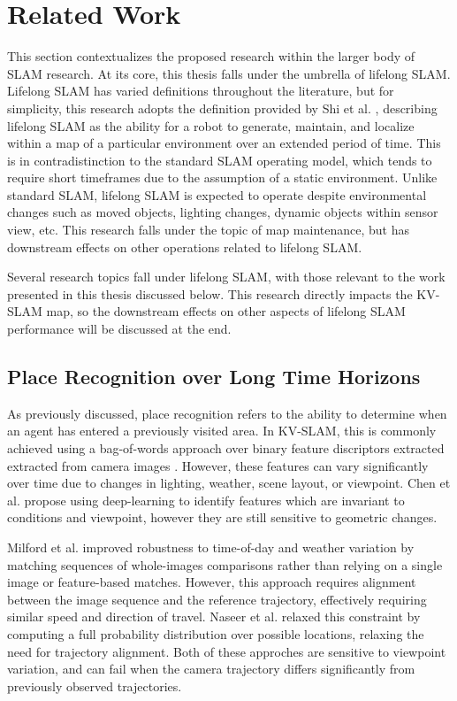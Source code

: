 \section{Related Work}
\label{sec:related_work}

This section contextualizes the proposed research within the larger body of SLAM research. At its core, this thesis falls under the umbrella of lifelong SLAM. Lifelong SLAM has varied definitions throughout the literature, but for simplicity, this research adopts the definition provided by Shi et al. \cite{shiAreWeReady2020}, describing lifelong SLAM as the ability for a robot to generate, maintain, and localize within a map of a particular environment over an extended period of time. This is in contradistinction to the standard SLAM operating model, which tends to require short timeframes due to the assumption of a static environment. Unlike standard SLAM, lifelong SLAM is expected to operate despite environmental changes such as moved objects, lighting changes, dynamic objects within sensor view, etc. This research falls under the topic of map maintenance, but has downstream effects on other operations related to lifelong SLAM.

Several research topics fall under lifelong SLAM, with those relevant to the work presented in this thesis discussed below. This research directly impacts the KV-SLAM map, so the downstream effects on other aspects of lifelong SLAM performance will be discussed at the end.

\subsection{Place Recognition over Long Time Horizons}

As previously discussed, place recognition refers to the ability to determine when an agent has entered a previously visited area. In KV-SLAM, this is commonly achieved using a bag-of-words approach over binary feature discriptors extracted extracted from camera images \cite{camposORBSLAM3AccurateOpenSource2021}. However, these features can vary significantly over time due to changes in lighting, weather, scene layout, or viewpoint. Chen et al. \cite{chenDeepLearningFeatures2017} propose using deep-learning to identify features which are invariant to conditions and viewpoint, however they are still sensitive to geometric changes.

Milford et al. improved robustness to time-of-day and weather variation by matching sequences of whole-images comparisons rather than relying on a single image or feature-based matches. However, this approach requires alignment between the image sequence and the reference trajectory, effectively requiring similar speed and direction of travel. Naseer et al. \cite{naseerVisionbasedMarkovLocalization2015} relaxed this constraint by computing a full probability distribution over possible locations, relaxing the need for trajectory alignment. Both of these approches are sensitive to viewpoint variation, and can fail when the camera trajectory differs significantly from previously observed trajectories.

